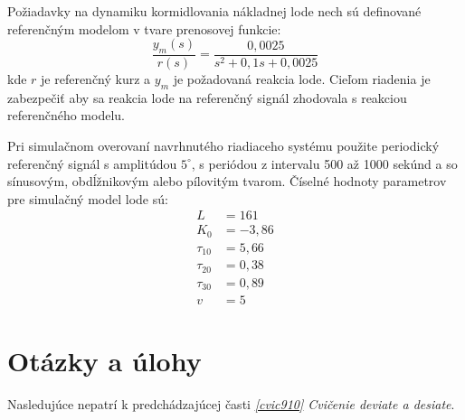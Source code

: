 ﻿\documentclass[a4paper, 10pt, ]{article}
\begin{document}
Požiadavky na dynamiku kormidlovania nákladnej lode nech sú definované referenčným modelom v tvare prenosovej funkcie:
\begin{equation}
	\frac{y_m(s)}{r(s)}
	=
	\frac{0,0025 }{s^2 + 0,1 s + 0,0025}
\end{equation}
kde $r$ je referenčný kurz a $y_m$ je požadovaná reakcia lode. Cieľom riadenia je zabezpečiť aby sa reakcia lode na referenčný signál zhodovala s reakciou referenčného modelu.

Pri simulačnom overovaní navrhnutého riadiaceho systému použite periodický referenčný signál s amplitúdou $5^\circ$, s periódou z intervalu 500 až 1000 sekúnd a so sínusovým, obdĺžnikovým alebo pílovitým tvarom. Číselné hodnoty parametrov pre simulačný model lode sú:
\begin{align*}
	L &= 161 \\
	K_0 &= -3,86 \\
	\tau_{10} &=  5,66 \\
	\tau_{20} &=  0,38 \\
	\tau_{30} &=  0,89 \\
	v &= 5
\end{align*}





























\section{Otázky a úlohy}


\noindent
Nasledujúce nepatrí k predchádzajúcej časti \emph{\ref{cvic910} Cvičenie deviate a desiate}.
\end{document}

